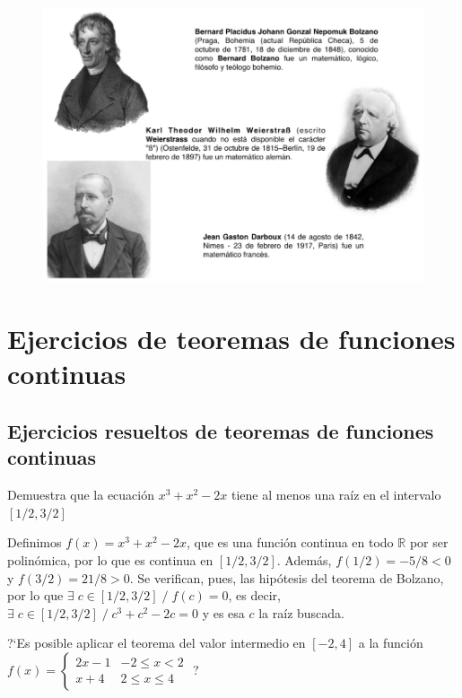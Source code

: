  		\begin{figure}[H]
 		\centering
			\includegraphics[width=1\textwidth]{imagenes/imagenes03/T03IM13.png}
		\end{figure}
 	
	\section{Ejercicios de teoremas de funciones continuas}
	
	\subsection{Ejercicios resueltos de teoremas de funciones continuas}
	
	
	\begin{ejre} Demuestra que la ecuación $x^3+x^2-2x$ tiene al menos una raíz en el intervalo $[1/2,3/2]$		
	\end{ejre}
	
	\begin{proofw}\renewcommand{\qedsymbol}{$\diamond$}
	
	Definimos $f(x)=x^3+x^2-2x$, que es una función continua en todo $\mathbb R$ por ser polinómica, por lo que es continua en $[1/2,3/2]$. Además, $f(1/2)=-5/8<0$ y $f(3/2)=21/8>0$. Se verifican, pues, las hipótesis del teorema de Bolzano, por lo que $\exists \; c \in [1/2,3/2] \; / \; f(c)=0$, es decir, $\exists \; c \in [1/2,3/2] \; / \; c^3+c^2-2c=0$ y es esa $c$ la raíz buscada.
	\end{proofw}
	
	
	\begin{ejre} ?`Es posible aplicar el teorema del valor intermedio en $[-2,4]$ a la función 		$f(x)=\left\{ \begin{matrix} 
		2x-1 & -2\le x <2 \\ 
		x+4 & 2 \le x \le 4  
		\end{matrix} \right.$ ?
	\end{ejre}
	
